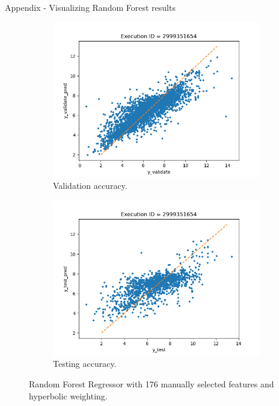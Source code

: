 \documentclass{beamer}
\begin{document}
\begin{frame}[t]{Appendix - Visualizing Random Forest results}
\begin{figure}
     \centering
     \begin{subfigure}[b]{0.45\textwidth}
         \centering
         \includegraphics[scale=0.35]{images/accuracyRFRvalidate}
         \caption{Validation accuracy.}
        \label{fig:accuracyRFRvalidate}
     \end{subfigure}
     \hfill
     \begin{subfigure}[b]{0.45\textwidth}
         \centering
         \includegraphics[scale=0.35]{images/accuracyRFRtest}
        \caption{Testing accuracy.}
        \label{fig:accuracyRFRtest}
     \end{subfigure}
     \caption{Random Forest Regressor with 176 manually selected features and hyperbolic weighting.}
     \label{fig:RFMModel}
\end{figure}
\end{frame}
\end{document}
